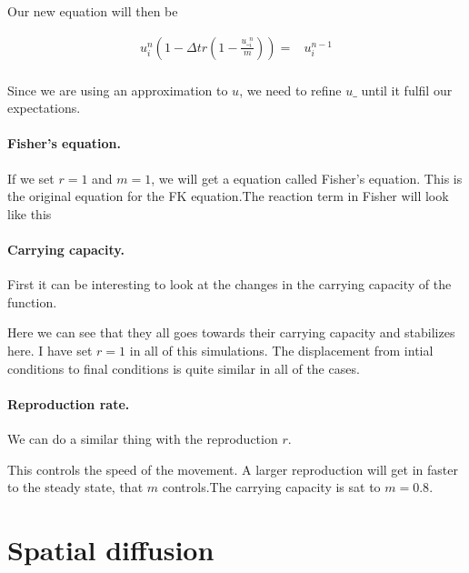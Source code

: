 \documentclass{article}
\begin{document}
Our new equation will then be

\begin{align*}
	u^n_i(1- \Delta t r(1-\frac{u\__i^n}{m}))=& u^{n-1}_i\\
\end{align*}

Since we are using an approximation to $u$, we need to refine $u\_$ until it
fulfil our expectations.

\paragraph{Fisher's equation.}
If we set $r=1$ and $m=1$, we will get a equation called Fisher's equation. This is the
original equation for the FK equation.The reaction term in Fisher will look like this


\paragraph{Carrying capacity.}
First it can be interesting to look at the changes in the carrying capacity of
the function.


Here we can see that they all goes towards their carrying capacity and stabilizes here.
I have set $r=1$ in all of this simulations. The displacement from intial conditions to
final conditions is quite similar in all of the cases.

\paragraph{Reproduction rate.}
We can do a similar thing with the reproduction $r$.


This controls the speed of the movement. A larger reproduction will get in faster
to the steady state, that $m$ controls.The carrying capacity is sat to $m=0.8$.


\section{Spatial diffusion}
\end{document}
